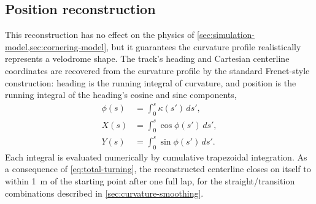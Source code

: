 \subsection{Position reconstruction}
\label{sec:position-reconstruction}

This reconstruction has no effect on the physics of
\cref{sec:simulation-model,sec:cornering-model}, but it guarantees the curvature
profile realistically represents a velodrome shape. The track's heading and
Cartesian centerline coordinates are recovered from the curvature profile by the
standard Frenet-style construction: heading is the running integral of
curvature, and position is the running integral of the heading's cosine and
sine components,
\begin{align}
    \phi(s) &= \int_0^s \kappa(s')\,ds', \label{eq:heading} \\
    X(s) &= \int_0^s \cos\phi(s')\,ds', \label{eq:x-pos} \\
    Y(s) &= \int_0^s \sin\phi(s')\,ds'. \label{eq:y-pos}
\end{align}
Each integral is evaluated numerically by cumulative trapezoidal integration.
As a consequence of \cref{eq:total-turning}, the reconstructed centerline
closes on itself to within \SI{1}{\metre} of the starting point after one full
lap, for the straight/transition combinations described in
\cref{sec:curvature-smoothing}.
